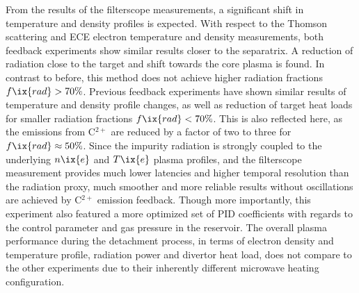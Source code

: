                From the results of the filterscope measurements, a significant shift in temperature and density profiles is expected. With respect to the Thomson scattering and ECE electron temperature and density measurements, both feedback experiments show similar results closer to the separatrix. A reduction of radiation close to the target and shift towards the core plasma is found. In contrast to before, this method does not achieve higher radiation fractions $f\ix{rad}>70\%$. Previous feedback experiments have shown similar results of temperature and density profile changes, as well as reduction of target heat loads for smaller radiation fractions $f\ix{rad}<70\%$. This is also reflected here, as the emissions from C$^{2+}$ are reduced by a factor of two to three for $f\ix{rad}\approx50\%$. Since the impurity radiation is strongly coupled to the underlying $n\ix{e}$ and $T\ix{e}$ plasma profiles, and the filterscope measurement provides much lower latencies and higher temporal resolution than the radiation proxy, much smoother and more reliable results without oscillations are achieved by C$^{2+}$ emission feedback. Though more importantly, this experiment also featured a more optimized set of PID coefficients with regards to the control parameter and gas pressure in the reservoir. The overall plasma performance during the detachment process, in terms of electron density and temperature profile, radiation power and divertor heat load, does not compare to the other experiments due to their inherently different microwave heating configuration\cite{Erckmann2007}.%
%
